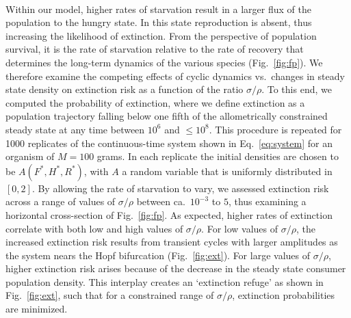 \documentclass{pnastwo}
\begin{document}
\begin{article}
\\
Within our model, higher rates of starvation result in a larger flux of the
population to the hungry state.  In this state reproduction is absent, thus
increasing the likelihood of extinction.  From the perspective of population
survival, it is the rate of starvation relative to the rate of recovery that
determines the long-term dynamics of the various species (Fig.~\ref{fig:fp}).
We therefore examine the competing effects of cyclic dynamics vs.\ changes in
steady state density on extinction risk as a function of the ratio
$\sigma/\rho$.  To this end, we computed the probability of extinction, where
we define extinction as a population trajectory falling below one fifth of
the allometrically constrained steady state at any time between $10^6$ and
$\leq 10^8$.  This procedure is repeated for 1000 replicates of the
continuous-time system shown in Eq.~\ref{eq:system} for an organism of
$M=100$ grams.
In each replicate the initial densities are chosen to be $A(F^*,H^*,R^*)$,
with $A$ a random variable that is uniformly distributed in $[0,2]$.  By
allowing the rate of starvation to vary, we assessed extinction risk across a
range of values of $\sigma/\rho$ between ca.\ $10^{-3}$ to $5$, thus examining
a horizontal cross-section of Fig.~\ref{fig:fp}.  As expected, higher rates
of extinction correlate with both low and high values of $\sigma/\rho$.  For
low values of $\sigma/\rho$, the increased extinction risk results from
transient cycles with larger amplitudes as the system nears the Hopf
bifurcation (Fig.~\ref{fig:ext}).  For large values of $\sigma/\rho$, higher
extinction risk arises because of the decrease in the steady state consumer
population density.  This interplay creates an `extinction refuge' as shown
in Fig.~\ref{fig:ext}, such that for a constrained range of $\sigma/\rho$,
extinction probabilities are minimized.


\end{article}
\end{document}
